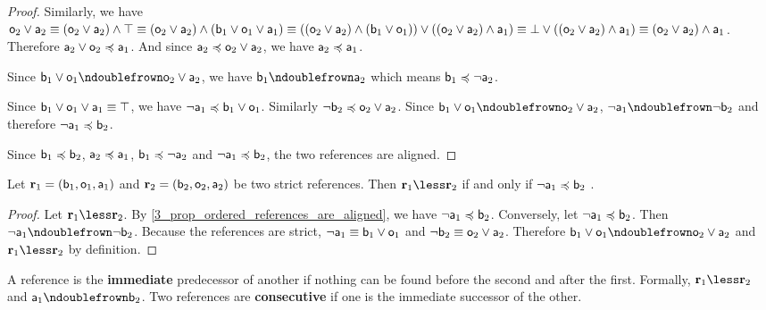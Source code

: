 \documentclass[11pt,letterpaper,fleqn]{memoir} %
\begin{document}
\begin{mathSection}
\begin{proof}
	Similarly, we have $\stmt[o]_2 \OR \stmt[a]_2 \equiv (\stmt[o]_2 \OR \stmt[a]_2) \AND \tautology \equiv (\stmt[o]_2 \OR \stmt[a]_2) \AND (\stmt[b]_1 \OR \stmt[o]_1 \OR \stmt[a]_1) \equiv ((\stmt[o]_2 \OR \stmt[a]_2) \AND (\stmt[b]_1 \OR \stmt[o]_1)) \OR ((\stmt[o]_2 \OR \stmt[a]_2) \AND \stmt[a]_1) \equiv \contradiction \OR ((\stmt[o]_2 \OR \stmt[a]_2) \AND \stmt[a]_1) \equiv (\stmt[o]_2 \OR \stmt[a]_2) \AND \stmt[a]_1$. Therefore $\stmt[a]_2 \OR \stmt[o]_2 \narrower \stmt[a]_1$. And since $\stmt[a]_2 \narrower \stmt[o]_2 \OR \stmt[a]_2$, we have $\stmt[a]_2 \narrower \stmt[a]_1$.
	
	Since $\stmt[b]_1 \OR \stmt[o]_1 \ncomp \stmt[o]_2 \OR \stmt[a]_2$, we have $\stmt[b]_1 \ncomp \stmt[a]_2$ which means $\stmt[b]_1 \narrower \NOT \stmt[a]_2$.
	
	Since $\stmt[b]_1 \OR \stmt[o]_1 \OR \stmt[a]_1 \equiv \tautology$, we have $\NOT \stmt[a]_1 \narrower \stmt[b]_1 \OR \stmt[o]_1$. Similarly $\NOT \stmt[b]_2 \narrower \stmt[o]_2 \OR \stmt[a]_2$. Since $\stmt[b]_1 \OR \stmt[o]_1 \ncomp \stmt[o]_2 \OR \stmt[a]_2$, $\NOT \stmt[a]_1 \ncomp \NOT \stmt[b]_2$ and therefore $\NOT \stmt[a]_1 \narrower \stmt[b]_2$.
	
	Since $\stmt[b]_1 \narrower \stmt[b]_2$, $\stmt[a]_2 \narrower \stmt[a]_1$, $\stmt[b]_1 \narrower \NOT \stmt[a]_2$ and $\NOT \stmt[a]_1 \narrower \stmt[b]_2$, the two references are aligned.
\end{proof}
\begin{prop}\label{3_prop_strict_references_ordering_condition}
	Let $\refStmt_1 = ( \stmt[b]_1, \stmt[o]_1, \stmt[a]_1 )$ and $\refStmt_2 = ( \stmt[b]_2, \stmt[o]_2, \stmt[a]_2 )$ be two strict references. Then $\refStmt_1 \less \refStmt_2$ if and only if $\NOT \stmt[a]_1 \narrower \stmt[b]_2$ .
\end{prop}
\begin{proof}
	Let $\refStmt_1 \less \refStmt_2$. By \ref{3_prop_ordered_references_are_aligned}, we have $\NOT \stmt[a]_1 \narrower \stmt[b]_2$. Conversely, let $\NOT \stmt[a]_1 \narrower \stmt[b]_2$. Then $\NOT \stmt[a]_1 \ncomp \NOT \stmt[b]_2$. Because the references are strict, $\NOT \stmt[a]_1 \equiv \stmt[b]_1 \OR \stmt[o]_1$ and $\NOT \stmt[b]_2 \equiv \stmt[o]_2 \OR \stmt[a]_2$. Therefore $\stmt[b]_1 \OR \stmt[o]_1 \ncomp \stmt[o]_2 \OR \stmt[a]_2$ and $\refStmt_1 \less \refStmt_2$ by definition.
\end{proof}

\begin{defn}
	A reference is the \textbf{immediate} predecessor of another if nothing can be found before the second and after the first. Formally, $\refStmt_1 \less \refStmt_2$ and $\stmt[a]_1 \ncomp \stmt[b]_2$. Two references are \textbf{consecutive} if one is the immediate successor of the other.
\end{defn}


\end{mathSection}
\end{document}
